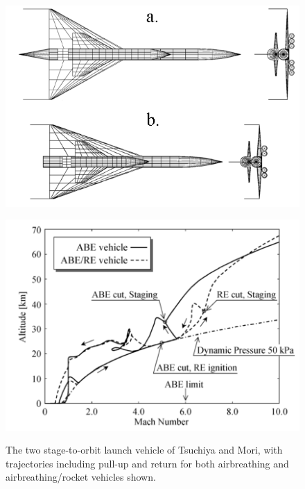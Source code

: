 \begin{figure}
	\centering
	\begin{minipage}[b]{0.45\textwidth}
		\centering
		\includegraphics[width=\linewidth]{"figures/2_literature-review/Tsuchiya Vehicles"}
	
		\label{fig:TsuchiyaVehicle}
	\end{minipage}	
	\begin{minipage}[b]{0.45\textwidth}
		\includegraphics[width=\linewidth]{"figures/2_literature-review/Tsuchiya"}

		\label{fig:TsuchiyaTrajectory}
	\end{minipage}
	\caption{The two stage-to-orbit launch vehicle of Tsuchiya and Mori\cite{Tsuchiya2005}, with trajectories including pull-up and return for both airbreathing and airbreathing/rocket vehicles shown.}
	\label{fig:Tsuchiya}
\end{figure}
